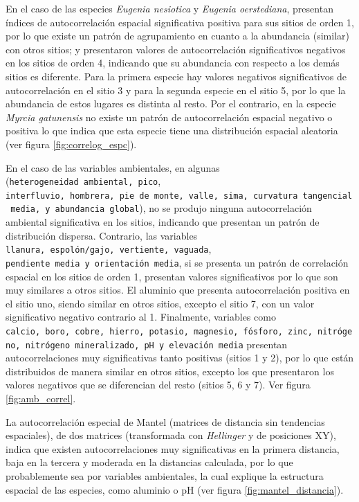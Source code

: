 \documentclass[11pt,]{article}
\begin{document}
En el caso de las especies \emph{Eugenia nesiotica} y \emph{Eugenia
oerstediana}, presentan índices de autocorrelación espacial
significativa positiva para sus sitios de orden 1, por lo que existe un
patrón de agrupamiento en cuanto a la abundancia (similar) con otros
sitios; y presentaron valores de autocorrelación significativos
negativos en los sitios de orden 4, indicando que su abundancia con
respecto a los demás sitios es diferente. Para la primera especie hay
valores negativos significativos de autocorrelación en el sitio 3 y para
la segunda especie en el sitio 5, por lo que la abundancia de estos
lugares es distinta al resto. Por el contrario, en la especie
\emph{Myrcia gatunensis} no existe un patrón de autocorrelación espacial
negativo o positiva lo que indica que esta especie tiene una
distribución espacial aleatoria (ver figura \ref{fig:correlog_espc}).

En el caso de las variables ambientales, en algunas
(\texttt{heterogeneidad\ ambiental,\ pico},
\texttt{interfluvio,\ hombrera,\ pie\ de\ monte,\ valle,\ sima,\ curvatura\ tangencial\ media,\ y\ abundancia\ global}),
no se produjo ninguna autocorrelación ambiental significativa en los
sitios, indicando que presentan un patrón de distribución dispersa.
Contrario, las variables
\texttt{llanura,\ espolón/gajo,\ vertiente,\ vaguada},
\texttt{pendiente\ media\ y\ orientación\ media}, si se presenta un
patrón de correlación espacial en los sitios de orden 1, presentan
valores significativos por lo que son muy similares a otros sitios. El
aluminio que presenta autocorrelación positiva en el sitio uno, siendo
similar en otros sitios, excepto el sitio 7, con un valor significativo
negativo contrario al 1. Finalmente, variables como
\texttt{calcio,\ boro,\ cobre,\ hierro,\ potasio,\ magnesio,\ fósforo,\ zinc,\ nitrógeno,\ nitrógeno\ mineralizado,\ pH\ y\ elevación\ media}
presentan autocorrelaciones muy significativas tanto positivas (sitios 1
y 2), por lo que están distribuidos de manera similar en otros sitios,
excepto los que presentaron los valores negativos que se diferencian del
resto (sitios 5, 6 y 7). Ver figura \ref{fig:amb_correl}.

La autocorrelación especial de Mantel (matrices de distancia sin
tendencias espaciales), de dos matrices (transformada con
\emph{Hellinger} y de posiciones XY), indica que existen
autocorrelaciones muy significativas en la primera distancia, baja en la
tercera y moderada en la distancias calculada, por lo que probablemente
sea por variables ambientales, la cual explique la estructura espacial
de las especies, como aluminio o pH (ver figura
\ref{fig:mantel_distancia}).
\end{document}
